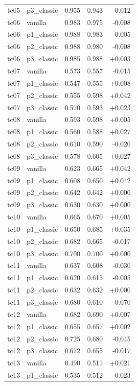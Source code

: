 \begin{longtable}{llrrr}
tc05 & p3\_classic & 0.955 & 0.943 & -0.012 \\
tc06 & vanilla & 0.983 & 0.975 & -0.008 \\
tc06 & p1\_classic & 0.988 & 0.983 & -0.005 \\
tc06 & p2\_classic & 0.988 & 0.980 & -0.008 \\
tc06 & p3\_classic & 0.985 & 0.988 & +0.003 \\
tc07 & vanilla & 0.573 & 0.557 & -0.015 \\
tc07 & p1\_classic & 0.547 & 0.555 & +0.008 \\
tc07 & p2\_classic & 0.555 & 0.598 & +0.042 \\
tc07 & p3\_classic & 0.570 & 0.593 & +0.023 \\
tc08 & vanilla & 0.593 & 0.598 & +0.005 \\
tc08 & p1\_classic & 0.560 & 0.588 & +0.027 \\
tc08 & p2\_classic & 0.610 & 0.590 & -0.020 \\
tc08 & p3\_classic & 0.578 & 0.605 & +0.027 \\
tc09 & vanilla & 0.623 & 0.665 & +0.042 \\
tc09 & p1\_classic & 0.608 & 0.650 & +0.042 \\
tc09 & p2\_classic & 0.642 & 0.642 & +0.000 \\
tc09 & p3\_classic & 0.630 & 0.630 & +0.000 \\
tc10 & vanilla & 0.665 & 0.670 & +0.005 \\
tc10 & p1\_classic & 0.650 & 0.685 & +0.035 \\
tc10 & p2\_classic & 0.682 & 0.665 & -0.017 \\
tc10 & p3\_classic & 0.700 & 0.700 & +0.000 \\
tc11 & vanilla & 0.637 & 0.608 & -0.030 \\
tc11 & p1\_classic & 0.620 & 0.615 & -0.005 \\
tc11 & p2\_classic & 0.632 & 0.632 & +0.000 \\
tc11 & p3\_classic & 0.680 & 0.610 & -0.070 \\
tc12 & vanilla & 0.682 & 0.690 & +0.007 \\
tc12 & p1\_classic & 0.655 & 0.657 & +0.002 \\
tc12 & p2\_classic & 0.725 & 0.680 & -0.045 \\
tc12 & p3\_classic & 0.672 & 0.655 & -0.017 \\
tc13 & vanilla & 0.490 & 0.511 & +0.021 \\
tc13 & p1\_classic & 0.535 & 0.512 & -0.023 \\

\end{longtable}
